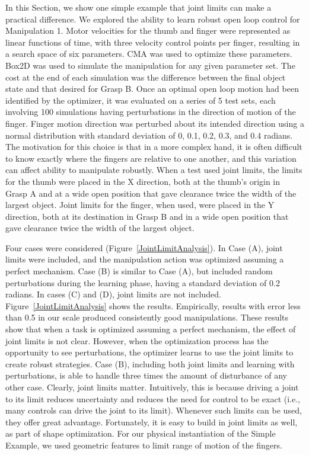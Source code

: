 In this Section, we show one simple example that joint limits can make a practical difference.   We explored the ability to learn robust open loop control for Manipulation 1.    Motor velocities for the thumb and finger were represented as linear functions of time, with three velocity control points per finger, resulting in a search space of six parameters.   CMA was used to optimize these parameters.    Box2D \cite{catto2011box2d} was used to simulate the manipulation for any given parameter set.   The cost at the end of each simulation was the difference between the final object state and that desired for Grasp B.     Once an optimal open loop motion had been identified by the optimizer, it was evaluated on a series of 5 test sets, each involving 100 simulations having perturbations in the direction of motion of the finger.    Finger motion direction was perturbed about its intended direction using a normal distribution with standard deviation of 0, 0.1, 0.2, 0.3, and 0.4 radians.    The motivation for this choice is that in a more complex hand, it is often difficult to know exactly where the fingers are relative to one another, and this variation can affect ability to manipulate robustly.   When a test used joint limits, the limits for the thumb were placed in the X direction, both at the thumb's origin in Grasp A and at a wide open position that gave clearance twice the width of the largest object.   Joint limits for the finger, when used, were placed in the Y direction, both at its destination in Grasp B and in a wide open position that gave clearance twice the width of the largest object.

Four cases were considered (Figure~\ref{JointLimitAnalysis}).   In Case (A), joint limits were included, and the manipulation action was optimized assuming a perfect mechanism.   Case (B) is similar to Case (A), but included random perturbations during the learning phase, having a standard deviation of 0.2 radians.    In cases (C) and (D), joint limits are not included.   Figure~\ref{JointLimitAnalysis} shows the results.   Empirically, results with error less than 0.5 in our scale produced consistently good manipulations.   These results show that when a task is optimized assuming a perfect mechanism, the effect of joint limits is not clear.    However, when the optimization process has the opportunity to see perturbations, the optimizer learns to use the joint limits to create robust strategies.    Case (B), including both joint limits and learning with perturbations, is able to handle three times the amount of disturbance of any other case.      Clearly, joint limits matter.  Intuitively, this is because driving a joint to its limit reduces uncertainty and reduces the need for control to be exact (i.e., many controls can drive the joint to its limit).   Whenever such limits can be used, they offer great advantage.   Fortunately, it is easy to build in joint limits as well, as part of shape optimization.   For our physical instantiation of the Simple Example, we used geometric features to limit range of motion of the fingers.

